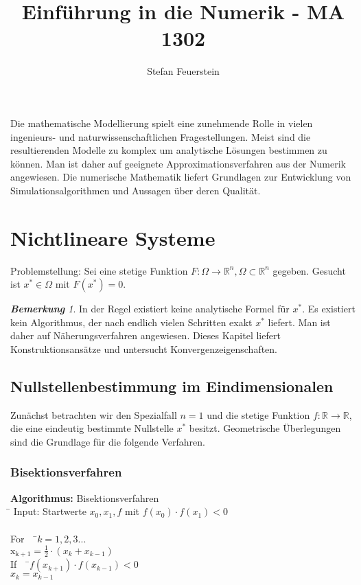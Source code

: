 \documentclass[10pt,a4paper]{article}
\author{Stefan Feuerstein}
\title {Einführung in die Numerik - MA 1302}
\theoremstyle{definition} \newtheorem{definition}{Definition}[section]
\theoremstyle{remark}     \newtheorem*{bemerkung}{\textbf{Bemerkung}} %
\begin{document}
\maketitle

Die mathematische Modellierung spielt eine zunehmende Rolle in vielen
ingenieurs- und naturwissenschaftlichen Fragestellungen.  Meist sind die
resultierenden Modelle zu komplex um analytische Lösungen bestimmen zu können.
Man ist daher auf geeignete Approximationsverfahren aus der Numerik angewiesen.
Die numerische Mathematik liefert Grundlagen zur Entwicklung von
Simulationsalgorithmen und Aussagen über deren Qualität.


\section{Nichtlineare Systeme}

Problemstellung: Sei eine stetige Funktion
$F: \Omega \longrightarrow \mathbb{R}^n, \Omega \subset \mathbb{R}^n$ gegeben.
Gesucht ist $x^*\in \Omega$ mit $F(x^*)=0$.
\newline

\begin{bemerkung}
In der Regel existiert keine analytische Formel für $x^*$.
Es existiert kein Algorithmus, der nach endlich vielen Schritten exakt $x^*$
liefert.  Man ist daher auf Näherungsverfahren angewiesen.  Dieses Kapitel
liefert Konstruktionsansätze und untersucht Konvergenzeigenschaften.
\end{bemerkung}

\subsection{Nullstellenbestimmung im Eindimensionalen}

Zunächst betrachten wir den Spezialfall $n=1$ und die stetige Funktion $f:
\mathbb{R} \longrightarrow \mathbb{R}$, die eine eindeutig bestimmte Nullstelle
$x^*$ besitzt. Geometrische Überlegungen sind die Grundlage für die folgende
Verfahren.


\subsubsection{Bisektionsverfahren}

\begin{tabbing}
\textbf{Algorithmus:} Bisektionsverfahren\\
\= \kill
Input: Startwerte $x_0, x_1, f$ mit $f(x_0) \cdot f(x_1) <0$\\
\newline
\\\> For \ \ \=$k=1,2,3...$\\ 
\> \> $\mathrm{x_{k+1}}= \frac{1}{2} \cdot (x_k + x_{k-1})$ \\
\> \> If \ \ \=$f(x_{k+1})\cdot f(x_{k-1})<0$\\
\> \> \> $x_k=x_{k-1}$ \\
\end{tabbing}
\end{document}
